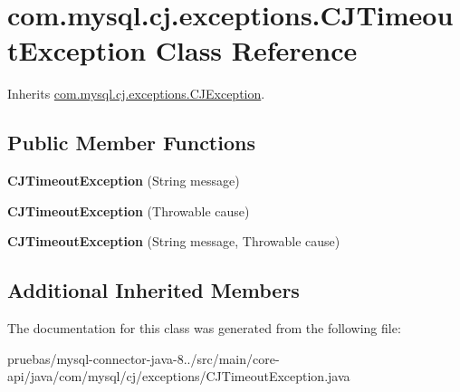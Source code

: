\hypertarget{classcom_1_1mysql_1_1cj_1_1exceptions_1_1_c_j_timeout_exception}{}\section{com.\+mysql.\+cj.\+exceptions.\+C\+J\+Timeout\+Exception Class Reference}
\label{classcom_1_1mysql_1_1cj_1_1exceptions_1_1_c_j_timeout_exception}


Inherits \mbox{\hyperlink{classcom_1_1mysql_1_1cj_1_1exceptions_1_1_c_j_exception}{com.\+mysql.\+cj.\+exceptions.\+C\+J\+Exception}}.

\subsection*{Public Member Functions}
\begin{DoxyCompactItemize}
\item 
\mbox{\label{classcom_1_1mysql_1_1cj_1_1exceptions_1_1_c_j_timeout_exception_a77c2e9166956b995c10f7836646be19e}} 
{\bfseries C\+J\+Timeout\+Exception} (String message)
\item 
\mbox{\label{classcom_1_1mysql_1_1cj_1_1exceptions_1_1_c_j_timeout_exception_a60271a4df1efbfe6c01767e0652f6997}} 
{\bfseries C\+J\+Timeout\+Exception} (Throwable cause)
\item 
\mbox{\label{classcom_1_1mysql_1_1cj_1_1exceptions_1_1_c_j_timeout_exception_a5b3db9824c2b446e1fad355a41d11793}} 
{\bfseries C\+J\+Timeout\+Exception} (String message, Throwable cause)
\end{DoxyCompactItemize}
\subsection*{Additional Inherited Members}


The documentation for this class was generated from the following file\+:\begin{DoxyCompactItemize}
\item 
pruebas/mysql-\/connector-\/java-\/8../src/main/core-\/api/java/com/mysql/cj/exceptions/C\+J\+Timeout\+Exception.\+java\end{DoxyCompactItemize}

